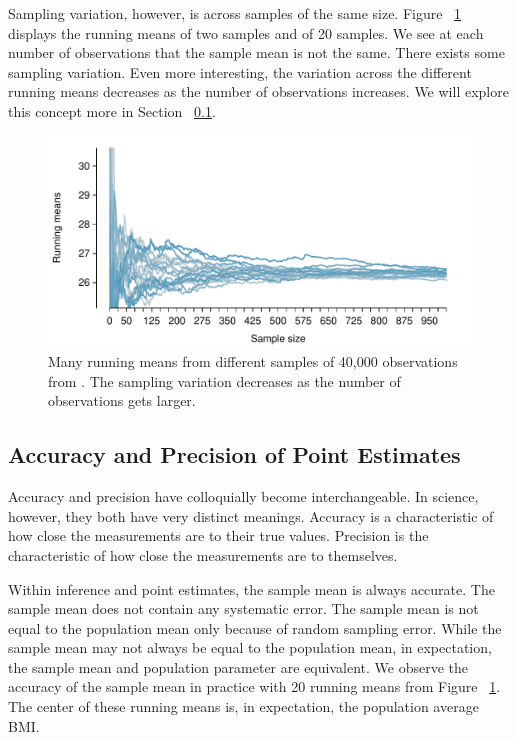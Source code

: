Sampling variation, however, is across samples of the same size. Figure ~\ref{runningSamplingVariation} displays the running means of two samples and of 20 samples. We see at each number of observations that the sample mean is not the same. There exists some sampling variation. Even more interesting, the variation across the different running means decreases as the number of observations increases. We will explore this concept more in Section ~\ref{accuracyAndPrecision}. 

\begin{figure}
   \centering
   \includegraphics[width=\textwidth]{ch_inference_foundations_oi_biostat/figures/brfssBMISampVar/brfssBMISampVar20}
   \caption{Many running means from different samples of 40,000 observations from . The sampling variation decreases as the number of observations gets larger.}
	\label{runningSamplingVariation}
\end{figure}



\subsection{Accuracy and Precision of Point Estimates}
\label{accuracyAndPrecision}

Accuracy and precision have colloquially become interchangeable. In science, however, they both have very distinct meanings. Accuracy is a characteristic of how close the measurements are to their true values. Precision is the characteristic of how close the measurements are to themselves. 

Within inference and point estimates, the sample mean is always accurate. The sample mean does not contain any systematic error. The sample mean is not equal to the population mean only because of random sampling error. While the sample mean may not always be equal to the population mean, in expectation, the sample mean and population parameter are equivalent. We observe the accuracy of the sample mean in practice with 20 running means from Figure ~\ref{runningSamplingVariation}. The center of these running means is, in expectation, the population average BMI. 

